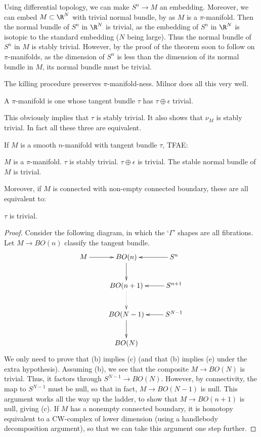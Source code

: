 \documentclass[11pt]{article}
\begin{document}
\begin{JandrKervaire}
Using differential topology, we can make $S^n\to M$ an embedding. Moreover, we can embed $M\subset \R^N$ with trivial normal bundle, by as $M$ is a $\pi$-manifold. Then the normal bundle of $S^n$ in $\R^N$ is trivial, as the embedding of $S^n$ in $\R^N$ is isotopic to the standard embedding ($N$ being large). Thus the normal bundle of $S^n$ in $M$ is stably trivial. However, by the proof of the theorem soon to follow on $\pi$-manifolds, as the dimension of $S^n$ is less than the dimension of its normal bundle in $M$, its normal bundle must be trivial.


 The killing procedure preserves $\pi$-manifold-ness. Milnor does all this very well.
\begin{defn*}
A $\pi$-manifold is one whose tangent bundle $\tau$ has $\tau\oplus\epsilon$ trivial.
\end{defn*}
\noindent This obviously implies that $\tau$ is stably trivial. It also shows that $\nu_M$ is stably trivial. In fact all these three are equivalent.
\begin{thm*}
If $M$ is a smooth $n$-manifold with tangent bundle $\tau$, TFAE:
\begin{itemise}\squishlist
\itm[(a)] $M$ is a $\pi$-manifold.
\itm[(b)] $\tau$ is stably trivial.
\itm[(c)] $\tau\oplus\epsilon$ is trivial.
\itm[(d)] The stable normal bundle of $M$ is trivial.
\end{itemise}
Moreover, if $M$ is connected with non-empty connected boundary, these are all equivalent to:
\begin{itemise}\squishlist
\itm[(e)] $\tau$ is trivial.
\end{itemise}
\end{thm*}
\begin{proof}
Consider the following diagram, in which the `$\Gamma$' shapes are all fibrations. Let $M\to BO(n)$ classify the tangent bundle.
\[\xymatrix{
M\ar[r]&BO(n)\ar[d]&S^n\ar[l]\\
&\ar@{..>}[d]BO(n+1)&\ar[l] S^{n+1}\\
&\ar[d]BO(N-1)&\ar[l] S^{N-1}\\
&BO(N)
}\]
We only need to prove that (b) implies (c) (and that (b) implies (e) under the extra hypothesis). Assuming (b), we see that the composite $M\to BO(N)$ is trivial. Thus, it factors through $S^{N-1}\to BO(N)$. However, by connectivity, the map to $S^{N-1}$ must be null, so that in fact, $M\to BO(N-1)$ is null. This argument works all the way up the ladder, to show that $M\to BO(n+1)$ is null, giving (c). If $M$ has a nonempty connected boundary, it is homotopy equivalent to a CW-complex of lower dimension (using a handlebody decomposition argument), so that we can take this argument one step further. 
\end{proof}

\end{JandrKervaire}
\end{document}
